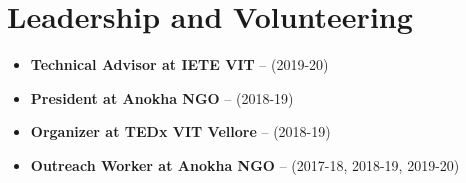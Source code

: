 \section{Leadership and Volunteering}

\vspace{1pt}

\begin{itemize}

\item \textbf{Technical Advisor at IETE VIT} -- (2019-20)
\item \textbf{President at Anokha NGO} -- (2018-19)
\item \textbf{Organizer at TEDx VIT Vellore} -- (2018-19)
\item \textbf{Outreach Worker at Anokha NGO} -- (2017-18, 2018-19, 2019-20)

\end{itemize}
